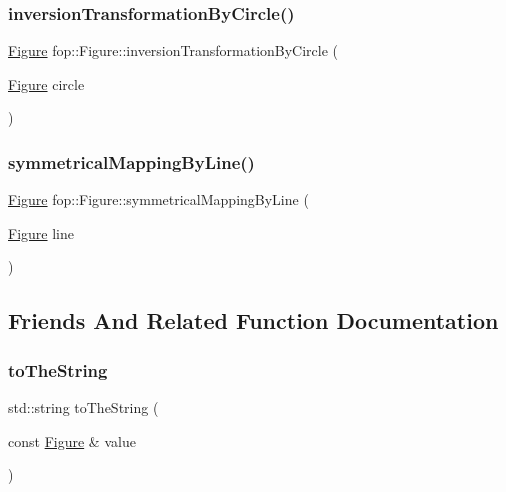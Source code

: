 \mbox{\label{classfop_1_1_figure_aae228e84324267f99ea7ece5067c94d9}} 
\subsubsection{\texorpdfstring{inversion\+Transformation\+By\+Circle()}{inversionTransformationByCircle()}}
{\footnotesize\ttfamily \mbox{\hyperlink{classfop_1_1_figure}{Figure}} fop\+::\+Figure\+::inversion\+Transformation\+By\+Circle (\begin{DoxyParamCaption}\item[{\mbox{\hyperlink{classfop_1_1_figure}{Figure}}}]{circle }\end{DoxyParamCaption})}

\mbox{\label{classfop_1_1_figure_a7f1666507e49eb3c2a79dc33ae49eb90}} 
\subsubsection{\texorpdfstring{symmetrical\+Mapping\+By\+Line()}{symmetricalMappingByLine()}}
{\footnotesize\ttfamily \mbox{\hyperlink{classfop_1_1_figure}{Figure}} fop\+::\+Figure\+::symmetrical\+Mapping\+By\+Line (\begin{DoxyParamCaption}\item[{\mbox{\hyperlink{classfop_1_1_figure}{Figure}}}]{line }\end{DoxyParamCaption})}



\subsection{Friends And Related Function Documentation}
\mbox{\label{classfop_1_1_figure_a64f76b9a0cc2e1c8d1f1a8a025e76078}} 
\subsubsection{\texorpdfstring{to\+The\+String}{toTheString}}
{\footnotesize\ttfamily std\+::string to\+The\+String (\begin{DoxyParamCaption}\item[{const \mbox{\hyperlink{classfop_1_1_figure}{Figure}} \&}]{value }\end{DoxyParamCaption})\hspace{0.3cm}{\ttfamily [friend]}}



